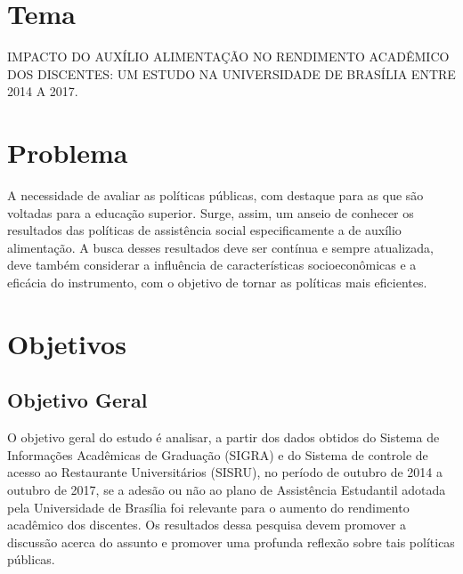 \section{Tema}%
IMPACTO DO AUXÍLIO ALIMENTAÇÃO NO RENDIMENTO ACADÊMICO DOS DISCENTES: UM ESTUDO NA UNIVERSIDADE DE BRASÍLIA ENTRE 2014 A 2017.

\section{Problema}%
A necessidade de avaliar as políticas públicas, com destaque para as que são voltadas para a educação superior. Surge, assim, um anseio de conhecer os resultados das políticas de assistência social especificamente a de auxílio alimentação. A busca desses resultados deve ser contínua e sempre atualizada, deve também considerar a influência de características socioeconômicas e a eficácia do instrumento, com o objetivo de tornar as políticas mais eficientes.

\section{Objetivos}%

\subsection{Objetivo Geral}
O objetivo geral do estudo é analisar, a partir dos dados obtidos do Sistema de Informações Acadêmicas de Graduação (SIGRA) e do Sistema de controle de acesso ao Restaurante Universitários (SISRU), no período de outubro de 2014 a outubro de 2017, se a adesão ou não ao plano de Assistência Estudantil adotada pela Universidade de Brasília foi relevante para o aumento do rendimento acadêmico dos discentes. Os resultados dessa pesquisa devem promover a discussão acerca do assunto e promover uma profunda reflexão sobre tais políticas públicas.

